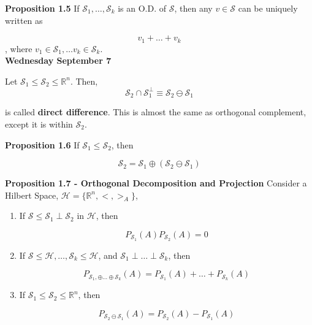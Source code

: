 \documentclass[11pt,fleqn]{book} %
\begin{document}
\textbf{Proposition 1.5} If $\mathscr{S}_1, \dots, \mathscr{S}_k$ is an O.D. of $\mathscr{S}$, then any $v \in \mathscr{S}$ can be uniquely written as

$$v_1 + \dots + v_k$$, where $v_1 \in \mathscr{S}_1, \dots v_k \in \mathscr{S}_k$. \\

\textbf{Wednesday September 7}

\begin{definition}
	Let $\mathscr{S}_1 \leq \mathscr{S}_2 \leq \mathbb{R}^n$. Then, \\

	$$\mathscr{S}_2 \cap \mathscr{S}_1^\perp \equiv \mathscr{S}_2 \ominus \mathscr{S}_1 $$ 

	is called \textbf{direct difference}. This is almost the same as orthogonal complement, except it is within $\mathscr{S}_2$. 

\end{definition}

\textbf{Proposition 1.6} If $\mathscr{S}_1 \leq \mathscr{S}_2$, then 

$$\mathscr{S}_2 = \mathscr{S}_1 \oplus (\mathscr{S}_2 \ominus \mathscr{S}_1) $$

\textbf{Proposition 1.7 - Orthogonal Decomposition and Projection} Consider a Hilbert Space, $\mathscr{H} = \{\mathbb{R}^n, <,>_A \}$, 

\begin{enumerate}
	\item If $\mathscr{S} \leq \mathscr{S}_1 \perp \mathscr{S}_2$ in $\mathscr{H}$, then 

	$$P_{\mathscr{S}_1} (A) P_{\mathscr{S}_2} (A) = 0  $$

	\item If $\mathscr{S} \leq \mathscr{H}, \dots, \mathscr{S}_k \leq \mathscr{H}$, and $\mathscr{S}_1 \perp \dots \perp \mathscr{S}_k$, then

	$$P_{\mathscr{S}_1, \oplus \dots \oplus \mathscr{S}_k} (A) = P_{\mathscr{S}_1} (A) + \dots + P_{\mathscr{S}_k} (A) $$

	\item If $\mathscr{S}_1 \leq \mathscr{S}_2 \leq \mathbb{R}^n$, then

	$$P_{\mathscr{S}_2 \ominus \mathscr{S}_1} (A) = P_{\mathscr{S}_2} (A) - P_{\mathscr{S}_1} (A)$$
\end{enumerate}
\end{document}
